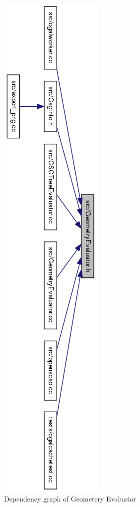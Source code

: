 \begin{figure}[H]
	\centering
	\includegraphics[height=1.37\columnwidth]{images/GeometryEvaluator_8h__dep__incl}
	\caption{Dependency graph of Geometery Evaluator}
	\label{fig:geometryevaluator8hdepincl}
\end{figure}

